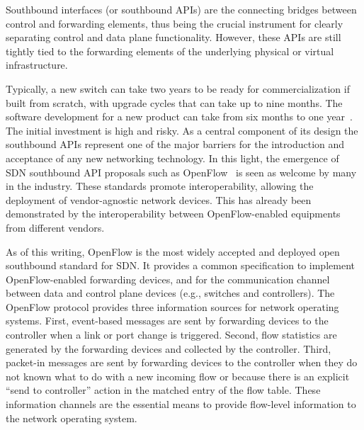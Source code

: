 Southbound interfaces (or southbound APIs) are the connecting bridges between control and forwarding 
elements, thus being the crucial instrument for clearly separating control and data plane functionality. However, 
these APIs are still tightly tied to the forwarding elements of the underlying physical or virtual 
infrastructure.

Typically, a new switch can take two years to be ready for commercialization if built from scratch, 
with upgrade cycles that can take up to nine months. The software development for a new product can 
take from six months to one year~\cite{kato2013}. The initial investment 
is high and risky. 
As a central component of its design the southbound APIs represent one of the major barriers for the introduction 
and acceptance of any new networking technology. 
In this light, the emergence of SDN southbound API proposals such as OpenFlow~\cite{mckeown2008} is seen as welcome by many in the industry.
These standards promote interoperability, allowing the deployment of vendor-agnostic network devices. 
This has already been demonstrated by the interoperability between OpenFlow-enabled equipments from different vendors.

As of this writing, OpenFlow is the most widely accepted and deployed open southbound standard 
for SDN. It provides a common specification to implement OpenFlow-enabled forwarding devices, and for the
communication channel between data and control plane devices (e.g., switches and controllers).
The OpenFlow protocol provides three information sources for network operating systems.
First, event-based messages are sent by forwarding devices to the controller when a link or port 
change is triggered. Second, flow statistics are generated by the forwarding devices and collected 
by the controller. Third, packet-in messages are sent by forwarding devices to the controller when 
they do not known what to do with a new incoming flow or because there is an explicit ``send to 
controller'' action in the matched entry of the flow table. These information channels are the essential 
means to provide flow-level information to the network operating system.

